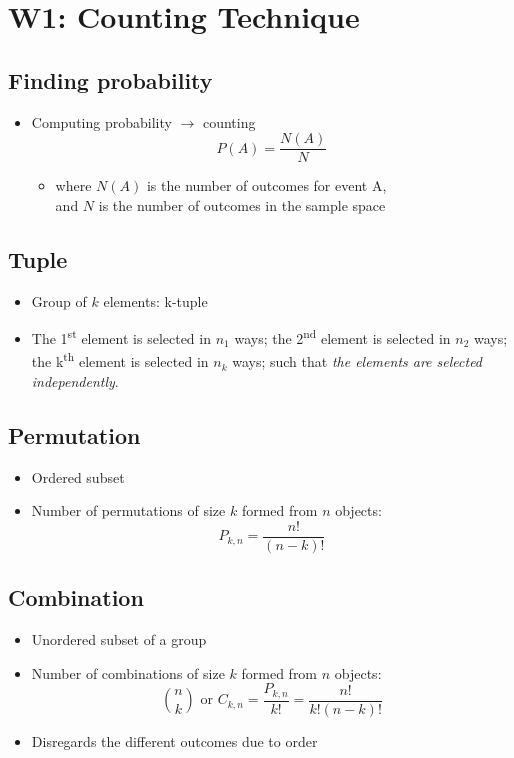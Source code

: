 \documentclass[a4paper]{article}
\begin{document}
\section{W1: Counting Technique}
\subsection{Finding probability}
\begin{itemize}
    \item Computing probability $\rightarrow{}$ counting
    $$P(A) = \frac{N(A)}{N}$$
    \begin{itemize}[label=$\circ$]
        \item where $N(A)$ is the number of outcomes for event A, \\and $N$ is the number of outcomes in the sample space  
    \end{itemize}
\end{itemize}
\subsection{Tuple}
\begin{itemize}
    \item Group of $k$ elements: k-tuple
    \item The 1\textsuperscript{st} element is selected in $n_1$ ways;
    the 2\textsuperscript{nd} element is selected in $n_2$ ways; the k\textsuperscript{th} element is selected in $n_k$ ways; such that \textit{the elements are selected independently}.
\end{itemize}
\subsection{Permutation}
\begin{itemize}
    \item Ordered subset
    \item Number of permutations of size $k$ formed from $n$ objects:
    $$P_{k, n} = \frac{n!}{(n-k)!}$$
\end{itemize}
\subsection{Combination}
\begin{itemize}
    \item Unordered subset of a group
    \item Number of combinations of size $k$ formed from $n$ objects:
    $$\binom{n}{k} \text{ or }C_{k, n} = \frac{P_{k, n}}{k!} = \frac{n!}{k!(n-k)!}$$
    \item Disregards the different outcomes due to order
\end{itemize}
\newpage
\end{document}
